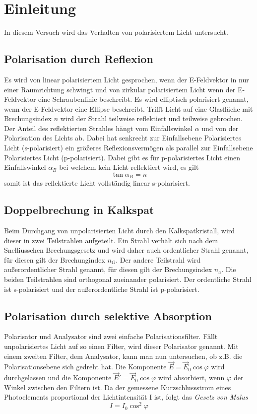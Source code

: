 \section{Einleitung}
In diesem Versuch wird das Verhalten von polarisiertem Licht untersucht.
\subsection{Polarisation durch Reflexion}
Es wird von linear polarisiertem Licht gesprochen, wenn der E-Feldvektor in nur einer Raumrichtung schwingt und von zirkular polarisiertem Licht wenn der E-Feldvektor eine Schraubenlinie beschreibt. Es wird elliptisch polarisiert genannt, wenn der E-Feldvektor eine Ellipse beschreibt.
Trifft Licht auf eine Glasfläche mit Brechungsindex $ n $ wird der Strahl teilweise reflektiert und teilweise gebrochen. Der Anteil des reflektierten Strahles hängt vom Einfallswinkel $ \alpha $ und von der Polarisation des Lichts ab.
Dabei hat senkrecht zur Einfallsebene Polarisiertes Licht (s-polarisiert) ein größeres Reflexionsvermögen als parallel zur Einfallsebene Polarisiertes Licht (p-polarisiert).
Dabei gibt es für p-polarisiertes Licht einen Einfallswinkel $ \alpha_{B} $ bei welchem kein Licht reflektiert wird, es gilt
\begin{equation}
\tan \alpha_{B} = n	\label{eq:brew}
\end{equation}
somit ist das reflektierte Licht vollständig linear s-polarisiert.
\subsection{Doppelbrechung in Kalkspat}
Beim Durchgang von unpolarisierten Licht durch den Kalkspatkristall, wird dieser in zwei Teilstrahlen aufgeteilt.
Ein Strahl verhält sich nach dem Snelliusschen Brechungsgesetz und wird daher auch ordentlicher Strahl genannt, für diesen gilt der Brechungindex $ n_{O} $. Der andere Teilstrahl wird außerordentlicher Strahl genannt, für diesen gilt der Brechungsindex $ n_{a} $. Die beiden Teilstrahlen sind orthogonal zueinander polarisiert. Der ordentliche Strahl ist s-polarisiert und der außerordentliche Strahl ist p-polarisiert.
\subsection{Polarisation durch selektive Absorption}
Polarisator und Analysator sind zwei einfache Polarisationsfilter. Fällt unpolarisiertes
Licht auf so einen Filter, wird dieser Polarisator genannt. Mit einem
zweiten Filter, dem Analysator, kann man nun untersuchen, ob z.B. die Polarisationsebene
sich gedreht hat. Die Komponente $\vec E = \vec E_0 \cos\varphi$ wird durchgelassen und die Komponente $\vec E' = \vec E_0 \cos\varphi$ wird absorbiert, wenn $\varphi$ der Winkel zwischen den Filtern ist. Da der gemessene Kurzschlussstrom eines Photoelements proportional der Lichtintensität I ist, folgt das \textit{Gesetz von Malus}
\begin{equation}
I = I_0 \cos^2\varphi \label{eq:malus}
\end{equation}
